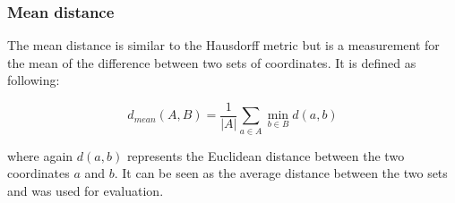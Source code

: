 \subsubsection{Mean distance}
The mean distance is similar to the Hausdorff metric but is a measurement for the mean of the difference between two sets of coordinates.\newline
It is defined as following:

\begin{equation}
	d_{mean} (A,B) = \frac{1}{|A|} \sum_{a \in A} \min_{b \in B} d(a,b)
\end{equation}

where again $d(a,b)$ represents the Euclidean distance between the two coordinates $a$ and $b$. It can be seen as the average distance between the two sets and was used for evaluation.
